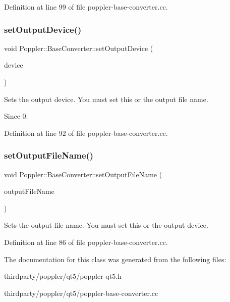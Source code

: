 Definition at line 99 of file poppler-\/base-\/converter.\+cc.

\mbox{\label{class_poppler_1_1_base_converter_a2cc2930a0cb160e8019589c75da0cccd}} 
\subsubsection{\texorpdfstring{set\+Output\+Device()}{setOutputDevice()}}
{\footnotesize\ttfamily void Poppler\+::\+Base\+Converter\+::set\+Output\+Device (\begin{DoxyParamCaption}\item[{Q\+I\+O\+Device $\ast$}]{device }\end{DoxyParamCaption})}

Sets the output device. You must set this or the output file name.

\begin{DoxySince}{Since}
0. 
\end{DoxySince}


Definition at line 92 of file poppler-\/base-\/converter.\+cc.

\mbox{\label{class_poppler_1_1_base_converter_aadbbf56d2cfd70441513e771351d5882}} 
\subsubsection{\texorpdfstring{set\+Output\+File\+Name()}{setOutputFileName()}}
{\footnotesize\ttfamily void Poppler\+::\+Base\+Converter\+::set\+Output\+File\+Name (\begin{DoxyParamCaption}\item[{const Q\+String \&}]{output\+File\+Name }\end{DoxyParamCaption})}

Sets the output file name. You must set this or the output device. 

Definition at line 86 of file poppler-\/base-\/converter.\+cc.



The documentation for this class was generated from the following files\+:\begin{DoxyCompactItemize}
\item 
thirdparty/poppler/qt5/poppler-\/qt5.\+h\item 
thirdparty/poppler/qt5/poppler-\/base-\/converter.\+cc\end{DoxyCompactItemize}
